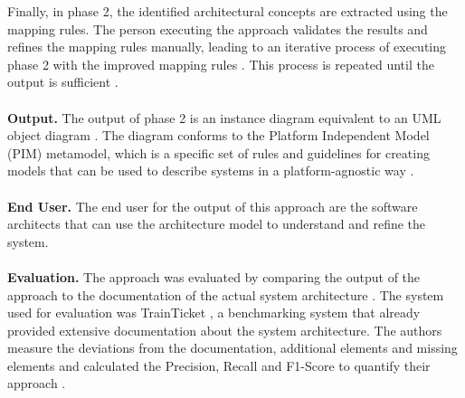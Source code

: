 Finally, in phase 2, the identified architectural concepts are extracted using the mapping rules.
The person executing the approach validates the results and refines the mapping rules manually, leading to an iterative process of executing phase 2 with the improved mapping rules \cite{Alshuqayran2020Thesis}.
This process is repeated until the output is sufficient \cite{Alshuqayran2020Thesis}.
\\ \\
\textbf{Output.}
The output of phase 2 is an instance diagram equivalent to an UML object diagram \cite{Alshuqayran2020Thesis}.
The diagram conforms to the Platform Independent Model (PIM) metamodel, which is a specific set of rules and guidelines for creating models that can be used to describe systems in a platform-agnostic way \cite{PIM}.
\\ \\
\textbf{End User.}
The end user for the output of this approach are the software architects that can use the architecture model to understand and refine the system.
\\ \\
\textbf{Evaluation.}
The approach was evaluated  by comparing the output of the approach to the documentation of the actual system architecture \cite{Alshuqayran2020Thesis}.
The system used for evaluation was TrainTicket \cite{Zhou2018TrainTicket}, a benchmarking system that already provided extensive documentation about the system architecture.
The authors measure the deviations from the documentation, additional elements and missing elements and calculated the Precision, Recall and F1-Score to quantify their approach \cite{Alshuqayran2020Thesis}.


